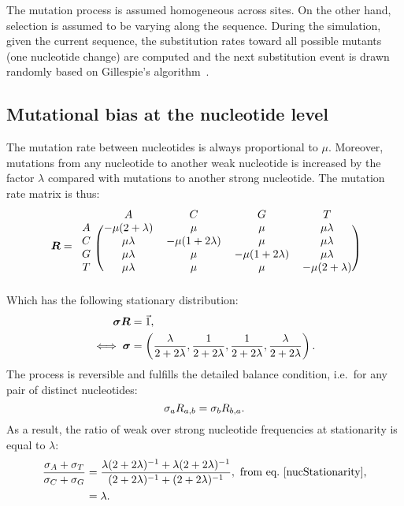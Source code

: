 The mutation process is assumed homogeneous across sites.
On the other hand, selection is assumed to be varying along the sequence.
During the simulation, given the current sequence, the substitution rates toward all possible mutants (one nucleotide change) are computed and the next substitution event is drawn randomly based on Gillespie’s algorithm~\citep{Gillespie1977}.

\subsection{Mutational bias at the nucleotide level}
\label{sec:mut-bias-mut-matrix}
The mutation rate between nucleotides is always proportional to $\mu$.
Moreover, mutations from any nucleotide to another weak nucleotide is increased by the factor $\lambda$ compared with mutations to another strong nucleotide.
The mutation rate matrix is thus:
\begin{equation}
    \label{nucMatrix}
    \Mutmatrix =
    \begin{blockarray}{ccccc}
        & A & C & G & T \\
        \begin{block}{c(cccc)}
            A & {-\mu(2 + \lambda)} & {\mu} & {\mu} & {\mu \lambda} \\
            C & {\mu \lambda} & {-\mu(1 + 2\lambda)} & {\mu} & {\mu \lambda} \\
            G & {\mu \lambda} & {\mu} & {-\mu(1 + 2\lambda)} & {\mu \lambda} \\
            T & {\mu \lambda} & {\mu} & {\mu} & {-\mu(2 + \lambda)} \\
        \end{block}
    \end{blockarray}
\end{equation}
Which has the following stationary distribution:
\begin{align}
    \bm{\sigma} \bm{R} & = \vec{1}, \\
    \iff \bm{\sigma} & = \left( \dfrac{\lambda}{2+2\lambda}, \dfrac{1}{2+2\lambda}, \dfrac{1}{2+2\lambda}, \dfrac{\lambda}{2+2\lambda} \right).
    \label{nucStationarity}
\end{align}
The process is reversible and fulfills the detailed balance condition, i.e.~for any pair of distinct nucleotides:
\begin{equation}
    \sigma_a R_{a, b} =\sigma_b R_{b, a}.
    \label{nucMutBalance}
\end{equation}
As a result, the ratio of weak over strong nucleotide frequencies at stationarity is equal to $\lambda$:
\begin{align}
    \label{lambda}
    \dfrac{ \mutequi_A + \mutequi_T }{ \mutequi_C + \mutequi_G }
    & = \dfrac{ \lambda ( 2 + 2 \lambda)^{-1} + \lambda ( 2 + 2 \lambda)^{-1}}{ ( 2 + 2 \lambda)^{-1} + ( 2 + 2 \lambda)^{-1}}, \ \text{from eq.~\ref{nucStationarity},}\\
    & = \lambda.
\end{align}

